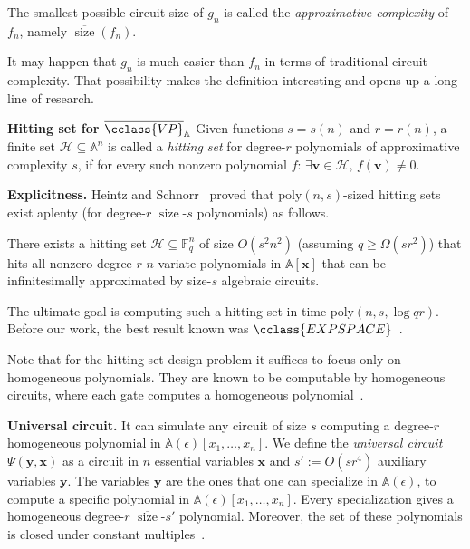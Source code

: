 \documentclass{toc}
\newcommand{\F}{\mathbb{F}}
\newcommand{\calH}{\mathcal{H}}
\newcommand{\aff}{\mathbb{A}}
\DeclareMathOperator{\sz}{\mathrm{size}}
\newcommand{\ol}[1]{\overline{#1}}
\newcommand{\EXPSPACE}{\cclass{EXPSPACE}\xspace} %
\newcommand{\VP}{\cclass{VP}\xspace}  %
\newcommand{\VPbar}{\overline{\VP}\xspace}  %
\begin{document}
The smallest possible circuit size of $g_n$ is called the \emph{approximative complexity} of $f_n$, namely $\ol{\sz}(f_n)$. 

It may happen that $g_n$ is much easier than $f_n$ in terms of traditional circuit complexity. That possibility makes the definition interesting and opens up a long line of research. 

\smallskip\noindent
%
\textbf{Hitting set for $\VPbar_\aff$}       %
Given functions $s=s(n)$ and $r=r(n)$, a finite
%
set %
$\calH\subseteq \aff^n$ is called a \emph{hitting set} for degree-$r$ polynomials of approximative complexity $s$, if for every such nonzero polynomial $f$: $\exists \mathbf v\in\calH, \, f(\mathbf v)\ne0$.

\smallskip\noindent
\textbf{Explicitness.} Heintz and Schnorr~\cite{heintz1980testing} proved that 
%
$\mathrm{poly}(n,s)$-sized %
hitting sets exist aplenty (for degree-$r$ $\ol{\sz}$-$s$ %
polynomials) as follows. %

%
\begin{lemma}\label{lem-hs80}
 There exists a 
 hitting set %
 $\mathcal{H}\subseteq \F_q^n $ of size $O(s^2n^2)$ (assuming $q\geq\Omega(sr^2)$) that hits all nonzero degree-$r$ $n$-variate polynomials in $\aff[\mathbf x]$ that can be infinitesimally approximated by size-$s$ algebraic circuits. 
\end{lemma}

The ultimate goal is computing such a hitting set in 
%
time $\mathrm{poly}(n,s,\log qr)$. %
Before our work, the best result known was
%
$\EXPSPACE$~\cite{mul12, mulmuley2017geometric}.

Note that for the hitting-set design problem it suffices to focus only on homogeneous polynomials. They are known to be computable by homogeneous circuits, where each gate computes a homogeneous polynomial~\cite{shpilka2010arithmetic}.

\smallskip\noindent
\textbf{Universal circuit.}
It can simulate any circuit of size $s$ computing a degree-$r$ homogeneous polynomial in $\aff(\epsilon)[x_1,\ldots,x_n]$. We define the \emph{universal circuit} $\Psi(\mathbf{y},\mathbf{x})$ as a circuit in $n$ essential variables $\mathbf{x}$ and $s':=O(sr^4)$ auxiliary variables $\mathbf y$. The variables $\mathbf y$ are the ones that one can specialize in $\aff(\epsilon)$, to compute a specific polynomial in $\aff(\epsilon)[x_1,\ldots,x_n]$. Every specialization gives a homogeneous degree-$r$ $\ol{\sz}$-$s'$ polynomial. Moreover, the set of these polynomials is closed under constant multiples~\cite[Theorem~2.2]{forbes2017pspace}.
\end{document}
